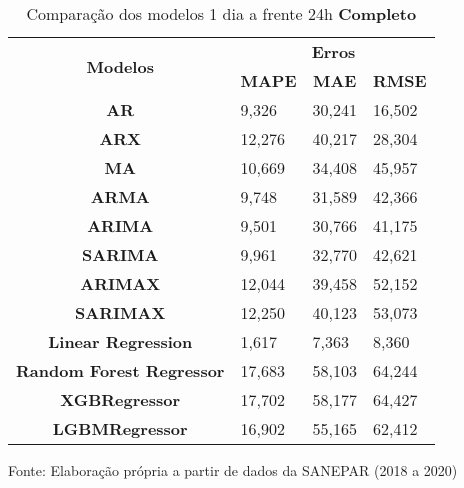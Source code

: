 \begin{table}[H]
	\centering
	\caption{Comparação dos modelos 1 dia a frente 24h \textbf{Completo} }\label{tb:1-24cm}
	\begin{tabular}{@{}clll@{}}
		\toprule
		\multirow{2}{*}{\textbf{Modelos}} & \multicolumn{3}{c}{\textbf{Erros}}                                                                       \\ \cmidrule(l){2-4} 
		& \multicolumn{1}{c}{\textbf{MAPE}} & \multicolumn{1}{c}{\textbf{MAE}} & \multicolumn{1}{c}{\textbf{RMSE}} \\ \hline
\textbf{AR}                       & 9,326                             & 30,241                           & 16,502                            \\
\textbf{ARX}                      & 12,276                            & 40,217                           & 28,304                            \\
\textbf{MA}                       & 10,669                            & 34,408                           & 45,957                            \\
\textbf{ARMA}                     & 9,748                             & 31,589                           & 42,366                            \\
\textbf{ARIMA}                    & 9,501                             & 30,766                           & 41,175                            \\
\textbf{SARIMA}                   & 9,961                             & 32,770                           & 42,621                            \\
\textbf{ARIMAX}                   & 12,044                            & 39,458                           & 52,152                            \\
\textbf{SARIMAX}                  & 12,250                            & 40,123                           & 53,073                            \\
\textbf{Linear Regression}        & 1,617                             & 7,363                            & 8,360                             \\
\textbf{Random Forest Regressor}  & 17,683                            & 58,103                           & 64,244                            \\
\textbf{XGBRegressor}             & 17,702                            & 58,177                           & 64,427                            \\
\textbf{LGBMRegressor}            & 16,902                            & 55,165                           & 62,412                            \\ \bottomrule
	\end{tabular}

Fonte: Elaboração própria a partir de dados da SANEPAR (2018 a 2020)
\end{table}


